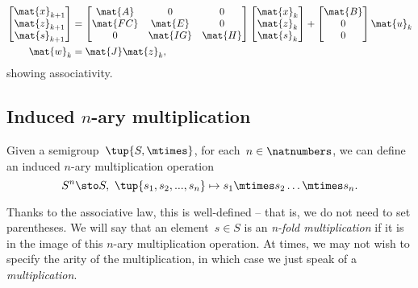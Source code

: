 \begin{equation*}
\label{eq:dlin-7}
\begin{aligned}
\begin{bmatrix}
\mat{x}_{k+1}\\
\mat{z}_{k+1}\\
\mat{s}_{k+1}
\end{bmatrix}&=
\begin{bmatrix}
\mat{A}&0&0\\
\mat{FC}&\mat{E}&0\\
0&\mat{IG}&\mat{H}
\end{bmatrix}\begin{bmatrix} \mat{x}_k\\ \mat{z}_k\\ \mat{s}_k\end{bmatrix}+
\begin{bmatrix}
\mat{B}\\ 0\\ 0
\end{bmatrix}\mat{u}_k\\
\mat{w}_k&=\mat{J}\mat{z}_k,
\end{aligned}
\end{equation*}
showing associativity.

\subsection{Induced $n$-ary multiplication}
Given a semigroup~$\tup{S, \mtimes}$, for each~$n \in \natnumbers$, we can define an induced $n$-ary multiplication operation
\begin{equation*}
  S^n \sto S, \ \tup{s_1, s_2, ..., s_n} \mapsto s_1 \mtimes s_2 \dots \mtimes s_n.
\end{equation*}





Thanks to the associative law, this is well-defined -- that is, we do not need to set parentheses.
We will say that an element~$s \in S$ is an \emph{n-fold multiplication} if it is in the image of this $n$-ary multiplication operation.
At times, we may not wish to specify the arity of the multiplication, in which case we just speak of a \emph{multiplication}.

\begin{comment}
\begin{equation}\label{eq:mora}
\mora
\end{equation}
\begin{equation}\label{eq:morb}
\morb
\end{equation}
\begin{equation}\label{eq:morab}
\mora\then\morb
\end{equation}

\end{comment}
